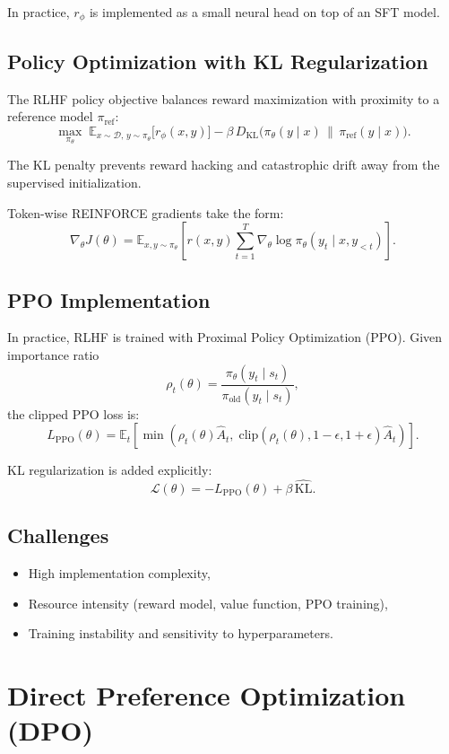 In practice, $r_\phi$ is implemented as a small neural head on top of an SFT model.

\subsection{Policy Optimization with KL Regularization}
The RLHF policy objective balances reward maximization with proximity to a reference model $\pi_{\text{ref}}$:
\[
\max_{\pi_\theta} \; \mathbb{E}_{x \sim \mathcal{D}, \, y \sim \pi_\theta} \Big[ r_\phi(x,y) \Big] 
- \beta \, D_{\text{KL}}\!\big( \pi_\theta(y \mid x) \,\|\, \pi_{\text{ref}}(y \mid x) \big).
\]

The KL penalty prevents reward hacking and catastrophic drift away from the supervised initialization.

Token-wise REINFORCE gradients take the form:
\[
\nabla_\theta J(\theta) = \mathbb{E}_{x,y \sim \pi_\theta}\!\left[ r(x,y) \sum_{t=1}^T \nabla_\theta \log \pi_\theta(y_t \mid x,y_{<t}) \right].
\]

\subsection{PPO Implementation}
In practice, RLHF is trained with Proximal Policy Optimization (PPO). Given importance ratio
\[
\rho_t(\theta) = \frac{\pi_\theta(y_t \mid s_t)}{\pi_{\text{old}}(y_t \mid s_t)},
\]
the clipped PPO loss is:
\[
L_{\text{PPO}}(\theta) = \mathbb{E}_t \left[ \min\!\left( \rho_t(\theta)\hat A_t,\;\text{clip}(\rho_t(\theta), 1-\epsilon, 1+\epsilon)\hat A_t \right)\right].
\]

KL regularization is added explicitly:
\[
\mathcal{L}(\theta) = - L_{\text{PPO}}(\theta) + \beta \, \widehat{\mathrm{KL}}.
\]

\subsection{Challenges}
\begin{itemize}
    \item High implementation complexity,
    \item Resource intensity (reward model, value function, PPO training),
    \item Training instability and sensitivity to hyperparameters.
\end{itemize}

\section{Direct Preference Optimization (DPO)}

